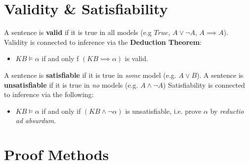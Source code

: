 \documentclass[11pt]{article}
\begin{document}
\section{Validity \& Satisfiability}
\label{sec:orge996c99}
A sentence is \textbf{valid} if it is true in all models (e.g \(True\), \(A\lor\neg A\), \(A\implies A\)).
Validity is connected to inference via the \textbf{Deduction Theorem}:
\begin{itemize}
\item \(KB \models \alpha\) if and only f \((KB \implies \alpha)\) is valid.
\end{itemize}
A sentence is \textbf{satisfiable} if it is true in \emph{some} model (e.g. \(A\lor B\)).
A sentence is \textbf{unsatisfiable} if it is true in \emph{no} models (e.g. \(A\land \neg A\))
Satisfiability is connected to inference via the following:
\begin{itemize}
\item \(KB \models \alpha\) if and only if \((KB \land \neg \alpha)\) is unsatisfiable, i.e. prove \(\alpha\) by \emph{reductio ad absurdum}.
\end{itemize}

\section{Proof Methods}
\label{sec:org12fc565}
\end{document}
